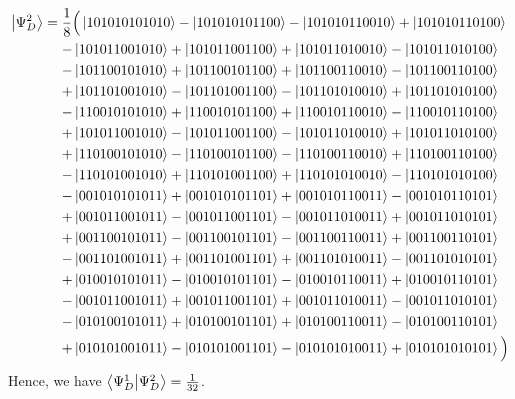 \documentclass[a4paper,12pt]{article}
\newcommand{\bleq}{\ensuremath{\mathrel{\phantom{=}}}}
\newcommand{\nnl}{\nonumber\\}
\begin{document}
{\footnotesize
\begin{align}
\ket{\Psi_D^2} &= \frac{1}{8} \Big(
  \ket{101010101010}
- \ket{101010101100}
- \ket{101010110010}
+ \ket{101010110100} \nnl &\bleq
- \ket{101011001010}
+ \ket{101011001100}
+ \ket{101011010010}
- \ket{101011010100} \nnl &\bleq
%
- \ket{101100101010}
+ \ket{101100101100}
+ \ket{101100110010}
- \ket{101100110100} \nnl &\bleq
+ \ket{101101001010}
- \ket{101101001100}
- \ket{101101010010}
+ \ket{101101010100} \nnl &\bleq
%
%
- \ket{110010101010}
+ \ket{110010101100}
+ \ket{110010110010}
- \ket{110010110100} \nnl &\bleq
+ \ket{101011001010}
- \ket{101011001100}
- \ket{101011010010}
+ \ket{101011010100} \nnl &\bleq
%
+ \ket{110100101010}
- \ket{110100101100}
- \ket{110100110010}
+ \ket{110100110100} \nnl &\bleq
- \ket{110101001010}
+ \ket{110101001100}
+ \ket{110101010010}
- \ket{110101010100} \nnl &\bleq
%
%
%
- \ket{001010101011}
+ \ket{001010101101}
+ \ket{001010110011}
- \ket{001010110101} \nnl &\bleq
+ \ket{001011001011}
- \ket{001011001101}
- \ket{001011010011}
+ \ket{001011010101} \nnl &\bleq
%
+ \ket{001100101011}
- \ket{001100101101}
- \ket{001100110011}
+ \ket{001100110101} \nnl &\bleq
- \ket{001101001011}
+ \ket{001101001101}
+ \ket{001101010011}
- \ket{001101010101} \nnl &\bleq
%
%
+ \ket{010010101011}
- \ket{010010101101}
- \ket{010010110011}
+ \ket{010010110101} \nnl &\bleq
- \ket{001011001011}
+ \ket{001011001101}
+ \ket{001011010011}
- \ket{001011010101} \nnl &\bleq
%
- \ket{010100101011}
+ \ket{010100101101}
+ \ket{010100110011}
- \ket{010100110101} \nnl &\bleq
+ \ket{010101001011}
- \ket{010101001101}
- \ket{010101010011}
+ \ket{010101010101}
\Big)
\end{align}}
Hence, we have $\braket{\Psi_D^1}{\Psi_D^2} = \tfrac{1}{32}$.
\end{document}
